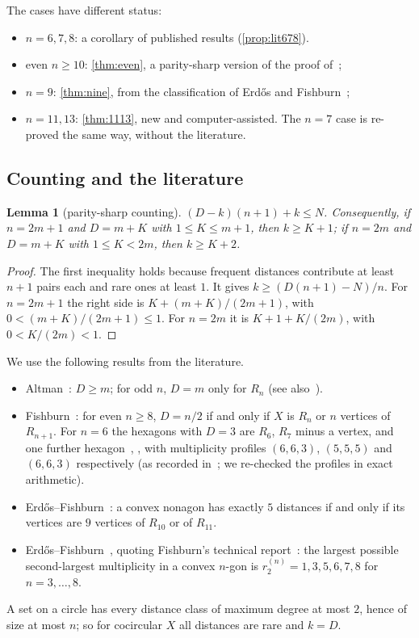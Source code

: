 \documentclass[11pt]{amsart}
\newtheorem{lemma}[theorem]{Lemma}
\theoremstyle{definition}
\theoremstyle{remark}
\begin{document}
The cases have different status:
\begin{itemize}[leftmargin=2em]
\item $n=6,7,8$: a corollary of published results (\cref{prop:lit678}).
\item even $n\ge10$: \cref{thm:even}, a parity-sharp version of the proof of~\cite[Theorem~1.2]{CDL25};
\item $n=9$: \cref{thm:nine}, from the classification of Erd\H{o}s and Fishburn~\cite{EF96};
\item $n=11,13$: \cref{thm:1113}, new and computer-assisted. The $n=7$ case is re-proved the same way, without the literature.
\end{itemize}

\subsection{Counting and the literature}

\begin{lemma}[parity-sharp counting]\label{lem:counting}
$(D-k)(n+1)+k\le N$. Consequently, if $n=2m+1$ and $D=m+K$ with $1\le K\le m+1$, then $k\ge K+1$; if $n=2m$ and $D=m+K$ with $1\le K<2m$, then $k\ge K+2$.
\end{lemma}
\begin{proof}
The first inequality holds because frequent distances contribute at least $n+1$ pairs each and rare ones at least $1$. It gives $k\ge(D(n+1)-N)/n$. For $n=2m+1$ the right side is $K+(m+K)/(2m+1)$, with $0<(m+K)/(2m+1)\le1$. For $n=2m$ it is $K+1+K/(2m)$, with $0<K/(2m)<1$.
\end{proof}

We use the following results from the literature.
\begin{itemize}[leftmargin=2em]
\item[(Alt)] Altman~\cite{Alt63,Alt72}: $D\ge m$; for odd $n$, $D=m$ only for $R_n$ (see also~\cite[Theorem~1]{Fi95}).
\item[(Fi)] Fishburn~\cite{Fi95}: for even $n\ge8$, $D=n/2$ if and only if $X$ is $R_n$ or $n$ vertices of $R_{n+1}$. For $n=6$ the hexagons with $D=3$ are $R_6$, $R_7$ minus a vertex, and one further hexagon~\cite[Theorem~2]{Fi95}, \cite{EF95b}, with multiplicity profiles $(6,6,3)$, $(5,5,5)$ and $(6,6,3)$ respectively (as recorded in~\cite[\S2]{CDL25}; we re-checked the profiles in exact arithmetic).
\item[(EF96)] Erd\H{o}s--Fishburn~\cite{EF96}: a convex nonagon has exactly $5$ distances if and only if its vertices are $9$ vertices of $R_{10}$ or of $R_{11}$.
\item[(r$_2$)] Erd\H{o}s--Fishburn~\cite[\S3]{EF95b}, quoting Fishburn's technical report~\cite{Fi92}: the largest possible second-largest multiplicity in a convex $n$-gon is $r_2^{(n)}=1,3,5,6,7,8$ for $n=3,\dots,8$.
\end{itemize}
A set on a circle has every distance class of maximum degree at most $2$, hence of size at most $n$; so for cocircular $X$ all distances are rare and $k=D$.
\end{document}
